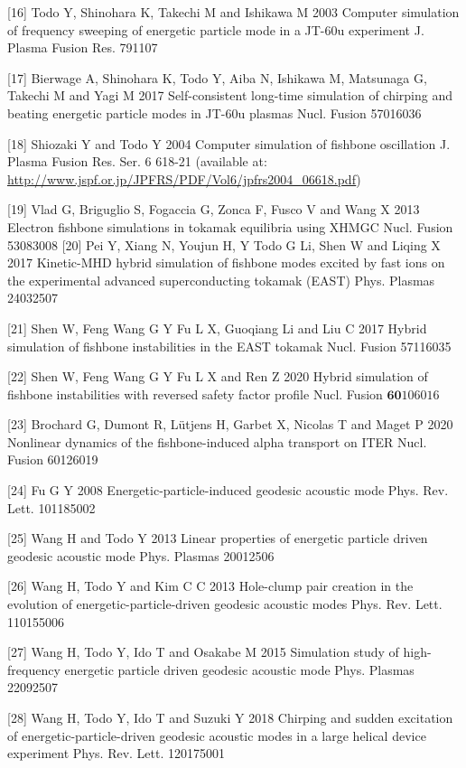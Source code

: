 \documentclass[10pt]{article}
\begin{document}
[16] Todo Y, Shinohara K, Takechi M and Ishikawa M 2003 Computer simulation of frequency sweeping of energetic particle mode in a JT-60u experiment J. Plasma Fusion Res. 791107

[17] Bierwage A, Shinohara K, Todo Y, Aiba N, Ishikawa M, Matsunaga G, Takechi M and Yagi M 2017 Self-consistent long-time simulation of chirping and beating energetic particle modes in JT-60u plasmas Nucl. Fusion 57016036

[18] Shiozaki Y and Todo Y 2004 Computer simulation of fishbone oscillation J. Plasma Fusion Res. Ser. 6 618-21 (available at: \href{http://www.jspf.or.jp/JPFRS/PDF/Vol6/jpfrs2004_06618.pdf}{http://www.jspf.or.jp/JPFRS/PDF/Vol6/jpfrs2004\_06618.pdf})

[19] Vlad G, Briguglio S, Fogaccia G, Zonca F, Fusco V and Wang X 2013 Electron fishbone simulations in tokamak equilibria using XHMGC Nucl. Fusion 53083008 [20] Pei Y, Xiang N, Youjun H, Y Todo G Li, Shen W and Liqing X 2017 Kinetic-MHD hybrid simulation of fishbone modes excited by fast ions on the experimental advanced superconducting tokamak (EAST) Phys. Plasmas 24032507

[21] Shen W, Feng Wang G Y Fu L X, Guoqiang Li and Liu C 2017 Hybrid simulation of fishbone instabilities in the EAST tokamak Nucl. Fusion 57116035

[22] Shen W, Feng Wang G Y Fu L X and Ren Z 2020 Hybrid simulation of fishbone instabilities with reversed safety factor profile $\mathrm{Nucl}$. Fusion $\mathbf{6 0} 106016$

[23] Brochard G, Dumont R, Lütjens H, Garbet X, Nicolas T and Maget P 2020 Nonlinear dynamics of the fishbone-induced alpha transport on ITER Nucl. Fusion 60126019

[24] Fu G Y 2008 Energetic-particle-induced geodesic acoustic mode Phys. Rev. Lett. 101185002

[25] Wang H and Todo Y 2013 Linear properties of energetic particle driven geodesic acoustic mode Phys. Plasmas 20012506

[26] Wang H, Todo Y and Kim C C 2013 Hole-clump pair creation in the evolution of energetic-particle-driven geodesic acoustic modes Phys. Rev. Lett. 110155006

[27] Wang H, Todo Y, Ido T and Osakabe M 2015 Simulation study of high-frequency energetic particle driven geodesic acoustic mode Phys. Plasmas 22092507

[28] Wang H, Todo Y, Ido T and Suzuki Y 2018 Chirping and sudden excitation of energetic-particle-driven geodesic acoustic modes in a large helical device experiment Phys. Rev. Lett. 120175001
\end{document}
